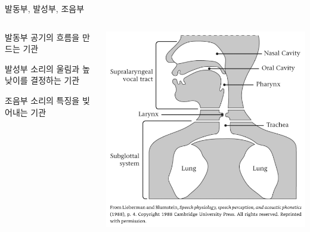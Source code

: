 \documentclass[11pt, aspectratio=169]{beamer}
\begin{document}
\begin{frame}[t]{발동부, 발성부, 조음부}
    \begin{columns}
        \begin{column}[T]{0.43\textwidth}
            \begin{block}{발동부}
                공기의 흐름을 만드는 기관
            \end{block}
            \begin{block}{발성부}
                소리의 울림과 높낮이를 결정하는 기관
            \end{block}
            \begin{block}{조음부}
                소리의 특징을 빚어내는 기관
            \end{block}
        \end{column}
        \begin{column}[T]{0.5\textwidth}
            \includegraphics[height=0.8\textheight]{img/speech_production_mechanism.png}
        \end{column}
    \end{columns}
\end{frame}
\end{document}
